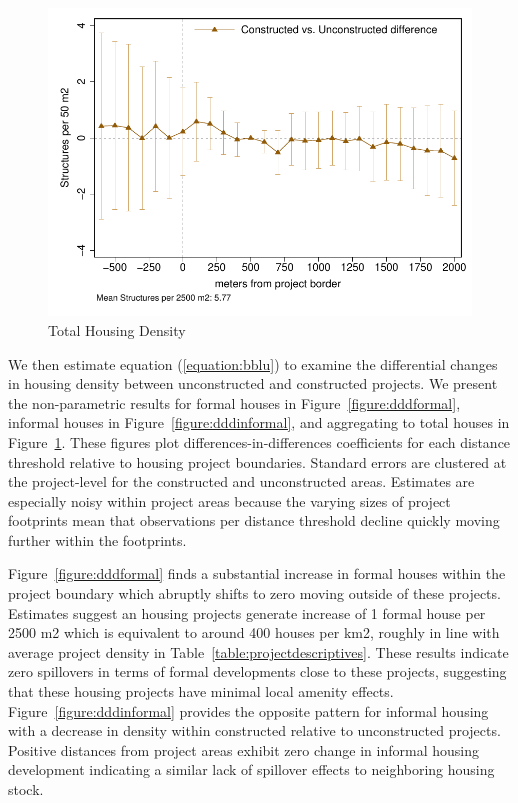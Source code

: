 \documentclass[12pt]{article}
\begin{document}
\begin{figure}
\caption{Total Housing Density}\label{figure:dddtotal}
\centering
\includegraphics[scale=.8]{figures/distplotDDD_bblu_total_buildings_admin.pdf}
\end{figure}

We then estimate equation (\ref{equation:bblu}) to examine the differential changes in housing density between unconstructed and constructed projects.  We present the non-parametric results for formal houses in Figure~\ref{figure:dddformal}, informal houses in Figure~\ref{figure:dddinformal}, and aggregating to total houses in Figure~\ref{figure:dddtotal}.  These figures plot differences-in-differences coefficients for each distance threshold relative to housing project boundaries.  Standard errors are clustered at the project-level for the constructed and unconstructed areas.  Estimates are especially noisy within project areas because the varying sizes of project footprints mean that observations per distance threshold decline quickly moving further within the footprints.

Figure~\ref{figure:dddformal} finds a substantial increase in formal houses within the project boundary which abruptly shifts to zero moving outside of these projects.  Estimates suggest an housing projects generate increase of 1 formal house per 2500 m2 which is equivalent to around 400 houses per km2, roughly in line with average project density in Table~\ref{table:projectdescriptives}.  These results indicate zero spillovers in terms of formal developments close to these projects, suggesting that these housing projects have minimal local amenity effects.  Figure~\ref{figure:dddinformal} provides the opposite pattern for informal housing with a decrease in density within constructed relative to unconstructed projects.  Positive distances from project areas exhibit zero change in informal housing development indicating a similar lack of spillover effects to neighboring housing stock.  
\end{document}
